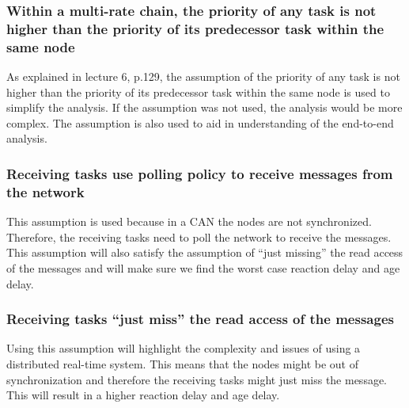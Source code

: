             \subsubsection*{Within a multi-rate chain, the priority of any task is not higher than the priority of its predecessor task within the same node}
                As explained in lecture 6, p.129, the assumption of the priority of any task is not higher than the priority of its predecessor task within the same node is used to simplify the analysis. If the assumption was not used, the analysis would be more complex. The assumption is also used to aid in understanding of the end-to-end analysis.

            \subsubsection*{Receiving tasks use polling policy to receive messages from the network}
                This assumption is used because in a CAN the nodes are not synchronized. Therefore, the receiving tasks need to poll the network to receive the messages. This assumption will also satisfy the assumption of “just missing” the read access of the messages and will make sure we find the worst case reaction delay and age delay.

            \subsubsection*{Receiving tasks “just miss” the read access of the messages}
                Using this assumption will highlight the complexity and issues of using a distributed real-time system. This means that the nodes might be out of synchronization and therefore the receiving tasks might just miss the message. This will result in a higher reaction delay and age delay.